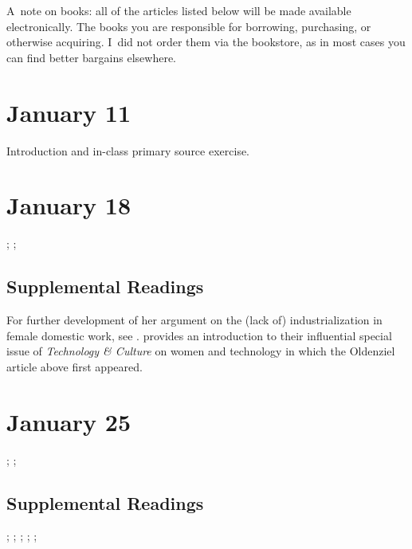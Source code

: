 \documentclass[11pt]{article}
\begin{document}
\noindent A~note on books: all of the articles listed below will be made available electronically.  The books you are responsible for borrowing, purchasing, or otherwise acquiring.  I~did not order them via the bookstore, as in most cases you can find better bargains elsewhere.

\small
\let\realeverypar\everypar
\realeverypar{\the\myeverypar\the\everypar}%
\newtoks\everypar %
\everypar{}
\newtoks\myeverypar \myeverypar{}

\myeverypar{\hangindent=1cm \small}

\section{January 11}

Introduction and in-class primary source exercise.

\cite{Turkle:1984hack}


\section{January 18}

\cite{Scott:1986ik}; \cite{Cowan:1976wda}; 
\cite{Oldenziel:1997to}

\subsection{Supplemental Readings}

For further development of her argument on the (lack of) industrialization in female domestic work, see \cite{Cowan:1983vm}.  \cite{Lerman:1997ui} provides an introduction to their influential special issue of \emph{Technology \& Culture} on women and technology in which the Oldenziel article above first appeared.


\section{January 25}

\cite{Bray:2007cb}; \cite{Kleif:2003wg}; \cite{Fischer:1988wl}

\subsection{Supplemental Readings}

\cite{Wajcman:2000vq}; \cite{Bray:1997wl}; \cite{Edwards:1990ua}; \cite{Pirsig:1974vs}; \cite{Ullman:1997vv}; \cite{Florman:1996um}
\end{document}

